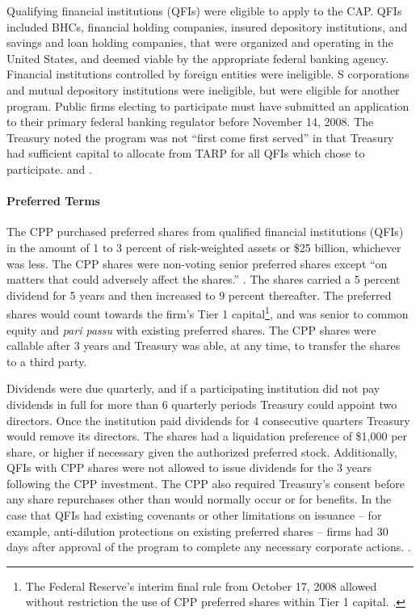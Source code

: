\documentclass[12pt]{article}
\begin{document}
Qualifying financial institutions (QFIs) were eligible to apply to the CAP. QFIs included BHCs, financial holding companies, insured depository institutions, and savings and loan holding companies, that were organized and operating in the United States, and deemed viable by the appropriate federal banking agency. Financial institutions controlled by foreign entities were ineligible. S corporations and mutual depository institutions were ineligible, but were eligible for another program. Public firms electing to participate must have submitted an application to their primary federal banking regulator before November 14, 2008. The Treasury noted the program was not ``first come first served'' in that Treasury had sufficient capital to allocate from TARP for all QFIs which chose to participate. \citep{mofo} and \citep{CPPTerms}.

\paragraph{Preferred Terms}

The CPP purchased preferred shares from qualified financial institutions (QFIs) in the amount of 1 to 3 percent of risk-weighted assets or \$25 billion, whichever was less. The CPP shares were non-voting senior preferred shares except ``on matters that could adversely affect the shares.'' \citep{CPPAnnouncement}. The shares carried a 5 percent dividend for 5 years and then increased to 9 percent thereafter. The preferred shares would count towards the firm's Tier 1 capital\footnote{The Federal Reserve's interim final rule from October 17, 2008 allowed without restriction the use of CPP preferred shares within Tier 1 capital. \citep{FedTier1}.}, and was senior to common equity and \textit{pari passu} with existing preferred shares. The CPP shares were callable after 3 years and Treasury was able, at any time, to transfer the shares to a third party.

Dividends were due quarterly, and if a participating institution did not pay dividends in full for more than 6 quarterly periods Treasury could appoint two directors. Once the institution paid dividends for 4 consecutive quarters Treasury would remove its directors. The shares had a liquidation preference of \$1,000 per share, or higher if necessary given the authorized preferred stock. Additionally, QFIs with CPP shares were not allowed to issue dividends for the 3 years following the CPP investment. The CPP also required Treasury's consent before any share repurchases other than would normally occur or for benefits. In the case that QFIs had existing covenants or other limitations on issuance -- for example, anti-dilution protections on existing preferred shares -- firms had 30 days after approval of the program to complete any necessary corporate actions. \citep{mofo2}.
\end{document}
